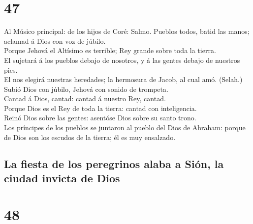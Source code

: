 \hypertarget{section-19-47}{%
\section{47}\label{section-19-47}}

 Al Músico principal: de los hijos de Coré: Salmo. Pueblos
todos, batid las manos; aclamad á Dios con voz de júbilo.\\
 Porque Jehová el Altísimo es terrible; Rey grande sobre
toda la tierra.\\
 El sujetará á los pueblos debajo de nosotros, y á las
gentes debajo de nuestros pies.\\
 El nos elegirá nuestras heredades; la hermosura de Jacob,
al cual amó. (Selah.)\\
 Subió Dios con júbilo, Jehová con sonido de trompeta.\\
 Cantad á Dios, cantad: cantad á nuestro Rey, cantad.\\
 Porque Dios es el Rey de toda la tierra: cantad con
inteligencia.\\
 Reinó Dios sobre las gentes: asentóse Dios sobre su santo
trono.\\
 Los príncipes de los pueblos se juntaron al pueblo del
Dios de Abraham: porque de Dios son los escudos de la tierra; él es muy
ensalzado.

\hypertarget{la-fiesta-de-los-peregrinos-alaba-a-siuxf3n-la-ciudad-invicta-de-dios}{%
\subsection{La fiesta de los peregrinos alaba a Sión, la ciudad invicta
de
Dios}\label{la-fiesta-de-los-peregrinos-alaba-a-siuxf3n-la-ciudad-invicta-de-dios}}

\hypertarget{section-19-48}{%
\section{48}\label{section-19-48}}

